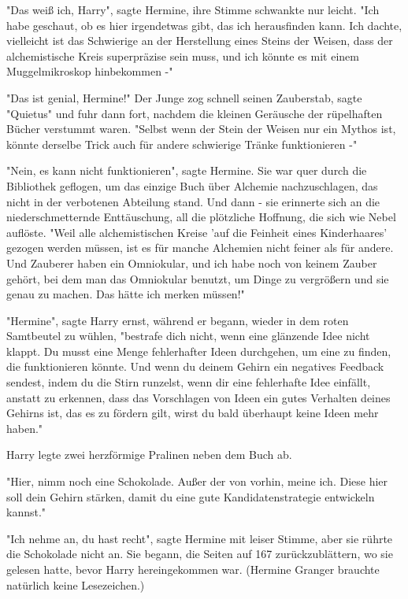 {"Das weiß ich, Harry", sagte Hermine, ihre Stimme schwankte nur leicht. "Ich habe geschaut, ob es hier irgendetwas gibt, das ich herausfinden kann. Ich dachte, vielleicht ist das Schwierige an der Herstellung eines Steins der Weisen, dass der alchemistische Kreis superpräzise sein muss, und ich könnte es mit einem Muggelmikroskop hinbekommen -"

"Das ist genial, Hermine!" Der Junge zog schnell seinen Zauberstab, sagte "Quietus" und fuhr dann fort, nachdem die kleinen Geräusche der rüpelhaften Bücher verstummt waren. "Selbst wenn der Stein der Weisen nur ein Mythos ist, könnte derselbe Trick auch für andere schwierige Tränke funktionieren -"

"Nein, es kann nicht funktionieren", sagte Hermine. Sie war quer durch die Bibliothek geflogen, um das einzige Buch über Alchemie nachzuschlagen, das nicht in der verbotenen Abteilung stand. Und dann - sie erinnerte sich an die niederschmetternde Enttäuschung, all die plötzliche Hoffnung, die sich wie Nebel auflöste. "Weil alle alchemistischen Kreise 'auf die Feinheit eines Kinderhaares' gezogen werden müssen, ist es für manche Alchemien nicht feiner als für andere. Und Zauberer haben ein Omniokular, und ich habe noch von keinem Zauber gehört, bei dem man das Omniokular benutzt, um Dinge zu vergrößern und sie genau zu machen. Das hätte ich merken müssen!"

"Hermine", sagte Harry ernst, während er begann, wieder in dem roten Samtbeutel zu wühlen, "bestrafe dich nicht, wenn eine glänzende Idee nicht klappt. Du musst eine Menge fehlerhafter Ideen durchgehen, um eine zu finden, die funktionieren könnte. Und wenn du deinem Gehirn ein negatives Feedback sendest, indem du die Stirn runzelst, wenn dir eine fehlerhafte Idee einfällt, anstatt zu erkennen, dass das Vorschlagen von Ideen ein gutes Verhalten deines Gehirns ist, das es zu fördern gilt, wirst du bald überhaupt keine Ideen mehr haben."

Harry legte zwei herzförmige Pralinen neben dem Buch ab.

"Hier, nimm noch eine Schokolade. Außer der von vorhin, meine ich. Diese hier soll dein Gehirn stärken, damit du eine gute Kandidatenstrategie entwickeln kannst."

"Ich nehme an, du hast recht", sagte Hermine mit leiser Stimme, aber sie rührte die Schokolade nicht an. Sie begann, die Seiten auf 167 zurückzublättern, wo sie gelesen hatte, bevor Harry hereingekommen war. (Hermine Granger brauchte natürlich keine Lesezeichen.)

}
